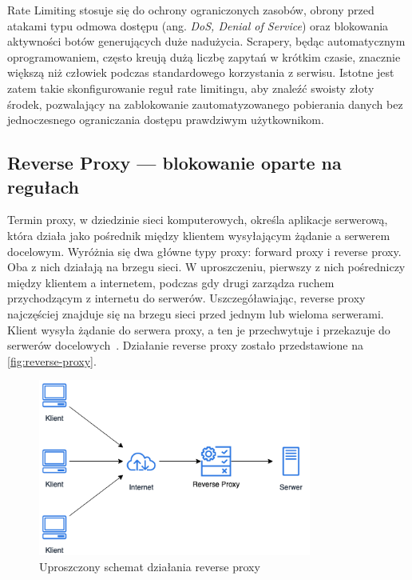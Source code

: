 Rate Limiting stosuje się do ochrony ograniczonych zasobów, obrony przed atakami typu odmowa dostępu (ang. \emph{DoS, Denial of Service})
oraz blokowania aktywności botów generujących duże nadużycia\@.
Scrapery, będąc automatycznym oprogramowaniem, często kreują dużą liczbę zapytań w krótkim czasie, znacznie większą niż człowiek podczas standardowego korzystania z serwisu.
Istotne jest zatem takie skonfigurowanie reguł rate limitingu, aby znaleźć swoisty złoty środek, pozwalający na zablokowanie zautomatyzowanego pobierania danych bez jednoczesnego ograniczania dostępu prawdziwym użytkownikom.

\newpage

\subsection{Reverse Proxy --- blokowanie oparte na regułach}\label{subsec:reverse-proxy}

Termin proxy, w dziedzinie sieci komputerowych, określa aplikacje serwerową, która działa jako pośrednik między klientem wysyłającym żądanie a serwerem docelowym.
Wyróżnia się dwa główne typy proxy: forward proxy i reverse proxy.
Oba z nich działają na brzegu sieci.
W uproszczeniu, pierwszy z nich pośredniczy między klientem a internetem, podczas gdy drugi zarządza ruchem przychodzącym z internetu do serwerów.
Uszczegóławiając, reverse proxy najczęściej znajduje się na brzegu sieci przed jednym lub wieloma serwerami.
Klient wysyła żądanie do serwera proxy, a ten je przechwytuje i przekazuje do serwerów docelowych~\cite{cloudflare-what-is-reverse-proxy}.
Działanie reverse proxy zostało przedstawione na \autoref{fig:reverse-proxy}.

\begin{figure}[H]
    \centering
    \captionsetup{width=.7\linewidth}
    \includegraphics[width=0.8\textwidth]{img/reverse-proxy}
    \caption{Uproszczony schemat działania reverse proxy}
    \label{fig:reverse-proxy}
\end{figure}

